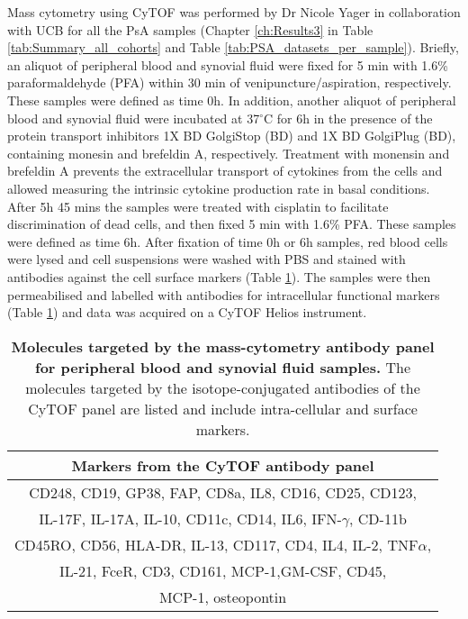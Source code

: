 Mass cytometry using CyTOF was performed by Dr Nicole Yager in collaboration with UCB for all the PsA samples (Chapter \ref{ch:Results3} in Table \ref{tab:Summary_all_cohorts} and Table \ref{tab:PSA_datasets_per_sample}). Briefly, an aliquot of peripheral blood and synovial fluid were fixed for 5 min with 1.6\% paraformaldehyde (PFA) within 30 min of venipuncture/aspiration, respectively. These samples were defined as time 0h. In addition, another aliquot of peripheral blood and synovial fluid were incubated at 37{$^\circ$}C for 6h in the presence of the protein transport inhibitors 1X BD GolgiStop (BD) and 1X BD GolgiPlug (BD), containing monesin and brefeldin A, respectively. Treatment with monensin and brefeldin A prevents the extracellular transport of cytokines from the cells and allowed measuring the intrinsic cytokine production rate in basal conditions. After 5h 45 mins the samples were treated with cisplatin to facilitate discrimination of dead cells, and then fixed 5 min with 1.6\% PFA. These samples were defined as time 6h. After fixation of time 0h or 6h samples, red blood cells were lysed and cell suspensions were washed with PBS and stained with antibodies against the cell surface markers (Table \ref{tab:CyTOF}). The samples were then permeabilised and labelled with antibodies for intracellular functional markers (Table \ref{tab:CyTOF}) and data was acquired on a CyTOF Helios instrument. 



\begin{table}[H]
\centering
\setlength{\tabcolsep}{20pt}
\renewcommand{\arraystretch}{0.8}
\begin{tabular}{@{} c}
\toprule
\textbf{Markers from the CyTOF antibody panel} \\
\midrule
\midrule
CD248, CD19, GP38, FAP, CD8a, IL8, CD16, CD25, CD123,\\
IL-17F, IL-17A, IL-10, CD11c, CD14, IL6, IFN-$\gamma$, CD-11b\\
CD45RO, CD56, HLA-DR, IL-13, CD117, CD4, IL4, IL-2, TNF$\alpha$,\\
IL-21, FceR, CD3, CD161, MCP-1,GM-CSF, CD45, \\
MCP-1, osteopontin\\ 
\bottomrule
\end{tabular}
\medskip %
\caption[Molecules targeted by the mass-cytometry antibody panel for peripheral blood and synovial fluid samples.]{\textbf{Molecules targeted by the mass-cytometry antibody panel for peripheral blood and synovial fluid samples.} The molecules targeted by the isotope-conjugated antibodies of the CyTOF panel are listed and include intra-cellular and surface markers.}
\label{tab:CyTOF}
\end{table}
\bigskip %




